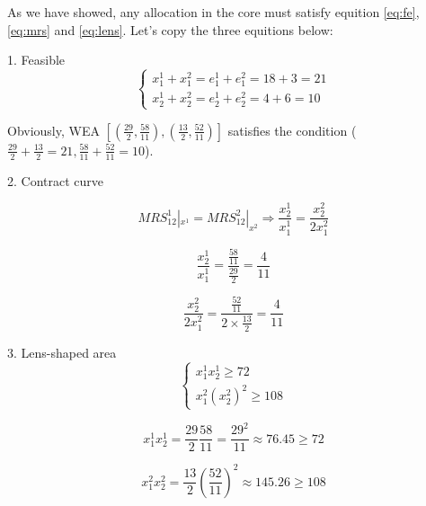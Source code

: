 \documentclass{article}
\begin{document}
As we have showed, any allocation in the core must satisfy equition \ref{eq:fe}, \ref{eq:mrs} and \ref{eq:lens}. Let's copy the three equitions below:

\vspace{2mm}

1. Feasible
\begin{equation}
    \begin{cases}
x^1_1+x^2_1= e^1_1 +e^2_1 = 18+3 =21 \\
x^1_2+x^2_2= e^1_2 +e^2_2 = 4+6 =10
    \end{cases}
\nonumber
\end{equation}

Obviously, WEA $[(\frac{29}{2},\frac{58}{11} ),(\frac{13}{2},\frac{52}{11})]$ satisfies the condition
($\frac{29}{2}+\frac{13}{2}=21,\frac{58}{11} +\frac{52}{11}=10$).

\vspace{2mm}

2. Contract curve

\begin{equation}
MRS^1_{12} |_{x^1} = MRS^2_{12}|_{x^2} \Rightarrow
\frac{x^1_2}{x^1_1} = \frac{x^2_2}{2x^2_1}
\nonumber
\end{equation}

$$\frac{x^1_2}{x^1_1} = \frac{\frac{58}{11}}{\frac{29}{2}} = \frac{4}{11}$$

$$\frac{x^2_2}{2x^2_1} = \frac{\frac{52}{11}}{2 \times \frac{13}{2}}= \frac{4}{11}$$

\vspace{2mm}

3. Lens-shaped area
\begin{equation}
    \begin{cases}
x^1_1 x^1_2 \ge 72 \\
x^2_1 (x^2_2)^2 \ge 108    \end{cases}
\nonumber
\end{equation}

$$x^1_1 x^1_2 = \frac{29}{2} \frac{58}{11} = \frac{29^2}{11} \approx 76.45 \ge 72$$

$$x^2_1 x^2_2 = \frac{13}{2} (\frac{52}{11})^2  \approx 145.26 \ge 108$$
\end{document}
